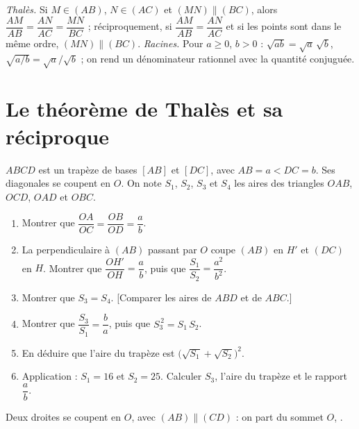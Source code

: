 \documentclass[12pt,a4paper]{article}
\begin{document}
\sommaire
\begin{rappels}
\emph{Thalès.} Si $M\in(AB)$, $N\in(AC)$ et $(MN)\parallel(BC)$, alors $\dfrac{AM}{AB}=\dfrac{AN}{AC}=\dfrac{MN}{BC}$ ;
réciproquement, si $\dfrac{AM}{AB}=\dfrac{AN}{AC}$ et si les points sont dans le même ordre, $(MN)\parallel(BC)$.
\emph{Racines.} Pour $a\ge0$, $b>0$ : $\sqrt{ab}=\sqrt a\,\sqrt b$, $\sqrt{a/b}=\sqrt a/\sqrt b$ ; on rend un dénominateur rationnel avec la quantité conjuguée.
\end{rappels}
\section{Le théorème de Thalès et sa réciproque}
\begin{corr}[title={Aires dans un trapèze}, stars=4, source={Axiomaths}]
$ABCD$ est un trapèze de bases $[AB]$ et $[DC]$, avec $AB=a<DC=b$. Ses diagonales se coupent en $O$. On note $S_1$, $S_2$, $S_3$ et $S_4$ les aires des triangles $OAB$, $OCD$, $OAD$ et $OBC$.

\begin{center}
\end{center}
\begin{enumerate}
  \item Montrer que $\dfrac{OA}{OC}=\dfrac{OB}{OD}=\dfrac ab$.
  \item La perpendiculaire à $(AB)$ passant par $O$ coupe $(AB)$ en $H'$ et $(DC)$ en $H$. Montrer que $\dfrac{OH'}{OH}=\dfrac ab$, puis que $\dfrac{S_1}{S_2}=\dfrac{a^2}{b^2}$.
  \item Montrer que $S_3=S_4$. [Comparer les aires de $ABD$ et de $ABC$.]
  \item Montrer que $\dfrac{S_3}{S_1}=\dfrac ba$, puis que $S_3^{\,2}=S_1\,S_2$.
  \item En déduire que l'aire du trapèze est $\big(\sqrt{S_1}+\sqrt{S_2}\big)^2$.
  \item Application : $S_1=16$ et $S_2=25$. Calculer $S_3$, l'aire du trapèze et le rapport $\dfrac ab$.
\end{enumerate}
\axsol
\begin{prop}
Deux droites se coupent en $O$, avec $(AB)\parallel(CD)$ : on part du sommet $O$, .


\end{prop}
\end{corr}
\end{document}
